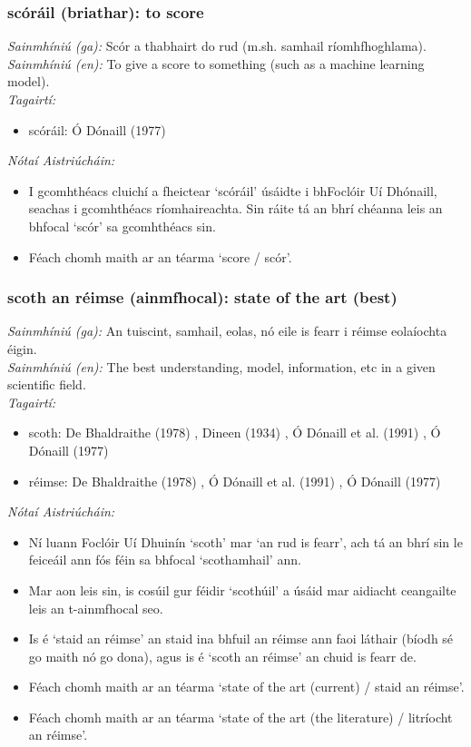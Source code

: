 \documentclass{article}
\begin{document}
\subsubsection*{scóráil (briathar): to score}
 \noindent \textit{Sainmhíniú (ga):} Scór a thabhairt do rud (m.sh. samhail ríomhfhoghlama).
\\
 \noindent \textit{Sainmhíniú (en):} To give a score to something (such as a machine learning model).
\\
 \noindent \textit{Tagairtí:}
\begin{itemize}
	\item scóráil: Ó Dónaill (1977) \cite{odonaill}
\end{itemize}

 \noindent \textit{Nótaí Aistriúcháin:}
\begin{itemize}
	\item I gcomhthéacs cluichí a fheictear `scóráil' úsáidte i bhFoclóir Uí Dhónaill, seachas i gcomhthéacs ríomhaireachta. Sin ráite tá an bhrí chéanna leis an bhfocal `scór' sa gcomhthéacs sin.
	\item Féach chomh maith ar an téarma `score / scór'.
\end{itemize}


\subsubsection*{scoth an réimse (ainmfhocal): state of the art (best)}
 \noindent \textit{Sainmhíniú (ga):} An tuiscint, samhail, eolas, nó eile is fearr i réimse eolaíochta éigin.
\\
 \noindent \textit{Sainmhíniú (en):} The best understanding, model, information, etc in a given scientific field.
\\
 \noindent \textit{Tagairtí:}
\begin{itemize}
	\item scoth: De Bhaldraithe (1978) \cite{de-bhaldraithe}, Dineen (1934) \cite{dineen}, Ó Dónaill et al. (1991) \cite{focloir-beag}, Ó Dónaill (1977) \cite{odonaill}
	\item réimse: De Bhaldraithe (1978) \cite{de-bhaldraithe}, Ó Dónaill et al. (1991) \cite{focloir-beag}, Ó Dónaill (1977) \cite{odonaill}
\end{itemize}

 \noindent \textit{Nótaí Aistriúcháin:}
\begin{itemize}
	\item Ní luann Foclóir Uí Dhuinín `scoth' mar `an rud is fearr', ach tá an bhrí sin le feiceáil ann fós féin sa bhfocal `scothamhail' ann.
	\item Mar aon leis sin, is cosúil gur féidir `scothúil' a úsáid mar aidiacht ceangailte leis an t-ainmfhocal seo.
	\item Is é `staid an réimse' an staid ina bhfuil an réimse ann faoi láthair (bíodh sé go maith nó go dona), agus is é `scoth an réimse' an chuid is fearr de.
	\item Féach chomh maith ar an téarma `state of the art (current) / staid an réimse'.
	\item Féach chomh maith ar an téarma `state of the art (the literature) / litríocht an réimse'.
\end{itemize}
\end{document}
